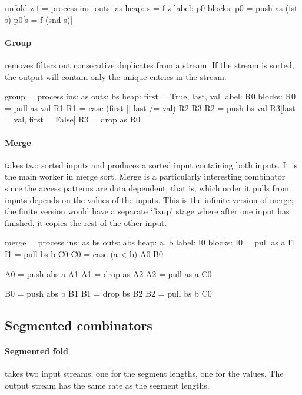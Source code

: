 \begin{code}
unfold z f = process
     ins: 
    outs: as
    heap: {s = f z}
   label: p0
  blocks: p0 = push as (fst s) p0[s = f (snd s)]
\end{code}

\paragraph{Group} removes filters out consecutive duplicates from a stream.
If the stream is sorted, the output will contain only the unique entries in the stream.

\begin{code}
group = process
     ins: as
    outs: bs
    heap: {first = True, last, val}
   label: R0
  blocks: R0 = pull as val R1
          R1 = case (first || last /= val) R2 R3
          R2 = push bs val R3[last = val, first = False]
          R3 = drop as     R0
\end{code}

\paragraph{Merge} takes two sorted inputs and produces a sorted input containing both inputs.
It is the main worker in merge sort.
Merge is a particularly interesting combinator since the access patterns are data dependent; that is, which order it pulls from inputs depends on the values of the inputs.
This is the infinite version of merge; the finite version would have a separate `fixup' stage where after one input has finished, it copies the rest of the other input.

\begin{code}
merge = process
     ins: as bs
    outs: abs
    heap: {a, b}
   label: I0
  blocks: I0 = pull as a  I1
          I1 = pull bs b  C0
          C0 = case (a < b) A0 B0

          A0 = push abs a A1
          A1 = drop as    A2
          A2 = pull as  a C0

          B0 = push abs b B1
          B1 = drop bs    B2
          B2 = pull bs  b C0
\end{code}

\subsection{Segmented combinators}

\paragraph{Segmented fold}
takes two input streams; one for the segment lengths, one for the values.
The output stream has the same rate as the segment lengths.

